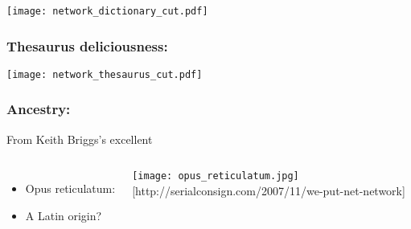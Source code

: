 \begin{frame}
  \texttt{[image: network\_dictionary\_cut.pdf]}
\end{frame}

\begin{frame}
  \frametitle{Thesaurus deliciousness:}

  \begin{center}
    \texttt{[image: network\_thesaurus\_cut.pdf]}
  \end{center}

\end{frame}





\begin{frame}
  \frametitle{Ancestry:}

  From Keith Briggs's excellent

  \medskip

  \begin{columns}
    \begin{itemize}
    \item<1-> 
      Opus reticulatum:
    \item<1-> 
      A Latin origin?
    \end{itemize}
    \texttt{[image: opus\_reticulatum.jpg]}\\
    {\tiny [http://serialconsign.com/2007/11/we-put-net-network]}
  \end{columns}

\end{frame}

